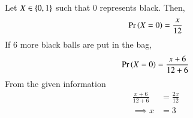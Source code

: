 Let $X \in \left\{0,1\right\}$ such that 0 represents black.  Then, 
\begin{align}
\Pr\left(X = 0\right) = \frac{x}{12}
\end{align}
%
If 6 more black balls are put in the bag, 
\begin{align}
\Pr\left(X = 0\right) = \frac{x+6}{12+6}
\end{align}
From the given information
\begin{align}
 \frac{x+6}{12+6}
&= \frac{2x}{12}
\\
\implies x &= 3
\end{align}
